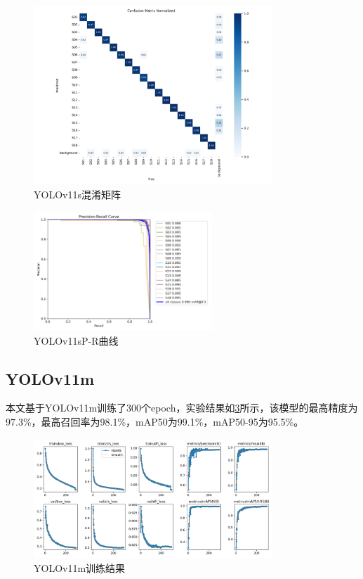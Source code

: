 \begin{figure}[h]
    \centering
    \includegraphics[width=0.8\textwidth]{figs/chap04/s_confusion_matrix_normalized.png}
    \caption{YOLOv11s混淆矩阵}
    \label{fig:smatrix}
\end{figure}

\begin{figure}[H]
    \centering
    \includegraphics[width=0.6\textwidth]{figs/chap04/s_PR_curve.png}
    \caption{YOLOv11sP-R曲线}
    \label{fig:spr}
\end{figure}

\subsection{YOLOv11m}
本文基于YOLOv11m训练了300个epoch，实验结果如\ref{fig:mresult}所示，该模型的最高精度为97.3\%，最高召回率为98.1\%，mAP50为99.1\%，mAP50-95为95.5\%。

\begin{figure}[H]
    \centering
    \includegraphics[width=0.8\textwidth]{figs/chap04/m_results.png}
    \caption{YOLOv11m训练结果}
    \label{fig:mresult}
\end{figure}

